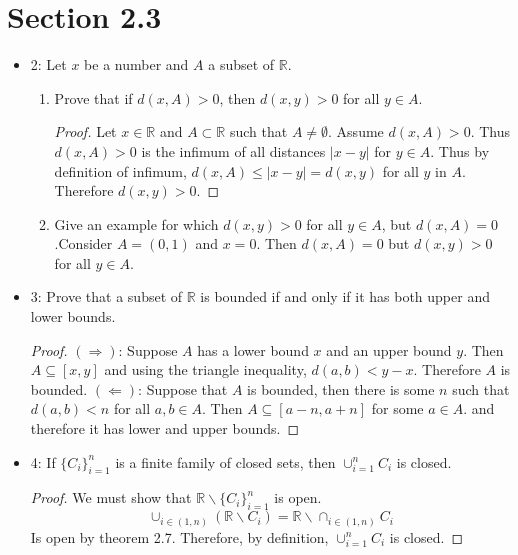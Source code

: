 \documentclass[hidelinks,12pt]{article}
\title{\scalebox{2}{Math 551 Homework 2}}
\author{\scalebox{1.5}{Theo Koss}}
\date{October 2021}
\theoremstyle{definition}
\newcommand{\R}{\mathbb{R}}
\begin{document}
\maketitle
\section{Section 2.3}
\begin{itemize}
    \item 2: Let $x$ be a number and $A$ a subset of $\R$.\begin{enumerate}[label=(\alph*)]
        \item Prove that if $d(x,A)>0$, then $d(x,y)>0$ for all $y\in A$.\begin{proof}Let $x\in\R$ and $A\subset\R$ such that $A\neq\emptyset$. Assume $d(x,A)>0$. Thus $d(x,A)>0$ is the infimum of all distances $|x-y|$ for $y\in A$. Thus by definition of infimum, $d(x,A)\leq|x-y|=d(x,y)$ for all $y$ in $A$. Therefore $d(x,y)>0$.
        \end{proof}
        \item Give an example for which $d(x,y)>0$ for all $y\in A$, but $d(x,A)=0$.\newline Consider $A=(0,1)$ and $x=0$. Then $d(x,A)=0$ but $d(x,y)>0$ for all $y\in A$.
        \end{enumerate}
    \item 3: Prove that a subset of $\R$ is bounded if and only if it has both upper and lower bounds.\begin{proof}$(\Longrightarrow)$: Suppose $A$ has a lower bound $x$ and an upper bound $y$. Then $A\subseteq[x,y]$ and using the triangle inequality, $d(a,b)<y-x$. Therefore $A$ is bounded.
    \newline$(\Longleftarrow)$: Suppose that $A$ is bounded, then there is some $n$ such that $d(a,b)<n$ for all $a,b\in A$. Then $A\subseteq[a-n,a+n]$ for some $a\in A$. and therefore it has lower and upper bounds.
    \end{proof}
    \item 4: If $\{C_i\}^{n}_{i=1}$ is a finite family of closed sets, then $\cup_{i=1}^{n}C_i$ is closed.\begin{proof}We must show that $\R\backslash \{C_i\}^{n}_{i=1}$ is open.$$\cup_{i\in(1,n)}(\R\backslash C_i)=\R\backslash\cap_{i\in(1,n)}C_i$$ Is open by theorem 2.7. Therefore, by definition, $\cup_{i=1}^{n}C_i$ is closed.
    \end{proof}

\end{itemize}
\end{document}
